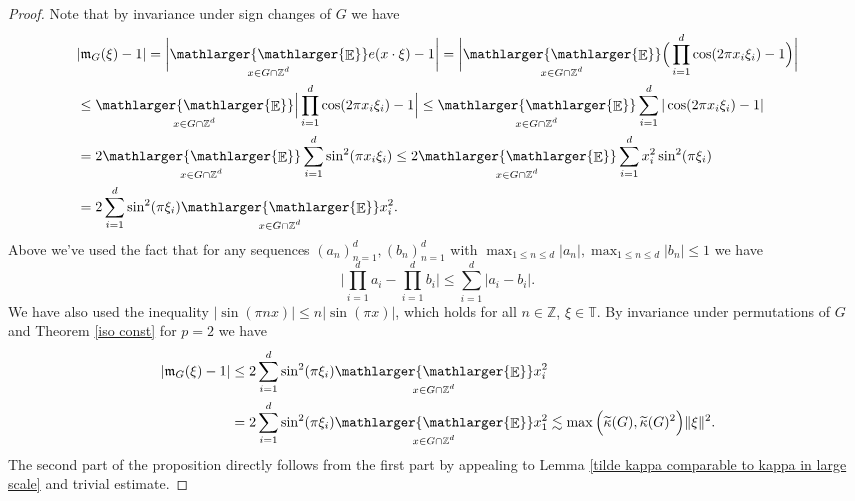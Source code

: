 \documentclass[a4paper,oneside, reqno]{amsart}
\numberwithin{equation}{section}
\theoremstyle{definition}%
\theoremstyle{definition}
\theoremstyle{definition}%
\theoremstyle{definition}
\newcommand{\E}{\mathop{\mathbb{E}}}
\newcommand{\Z}{\mathbb{Z}}
\newcommand{\T}{\mathbb{T}}
\newcommand{\se}[1]{\underset{_{\substack{#1}}}{\mathlarger{\mathlarger{\E}}}}
\begin{document}
\begin{proof}
    Note that by invariance under sign changes of $G$ we have
    \begin{align*}
      &|\mathfrak{m}_G(\xi)-1|= \bigg| \se{x \in G \cap \Z^d} e(x \cdot \xi) -1 \bigg|= \bigg| \se{x \in G \cap \Z^d} \Big( \prod_{i=1}^d \cos(2 \pi x_i \xi_i) -1  \Big)\bigg| \\
      &\le \se{x \in G \cap \Z^d}\Big| \prod_{i=1}^d \cos(2 \pi x_i \xi_i) -1  \Big| \le  \se{x \in G \cap \Z^d} \sum_{i=1}^d | \cos(2 \pi x_i \xi_i) -1|  \\
      &=2 \se{x \in G \cap \Z^d} \sum_{i=1}^d \sin^2(\pi x_i \xi_i) \le 2\se{x \in G \cap \Z^d} \sum_{i=1}^d x_i^2\sin^2(\pi \xi_i) \\
      &=2\sum_{i=1}^d \sin^2(\pi \xi_i)\se{x \in G \cap \Z^d} x_i^2.
    \end{align*}
    Above we've used the fact that for any sequences $(a_n)_{n=1}^d, (b_n)_{n=1}^d$ with $\max_{1\le n \le d} |a_n|, \max_{1\le n \le d} |b_n| \le 1$ we have
    \[
    \Big|\prod_{i=1}^d a_i- \prod_{i=1}^d b_i \Big| \le \sum_{i=1}^d |a_i-b_i|.
    \]
    We have also used the inequality $|\sin(\pi n x)| \le n |\sin(\pi x)| $, which holds for all $n \in \Z$, $\xi \in \T$. By invariance under permutations of $G$ and Theorem \ref{iso const} for $p=2$ we have 
    \begin{align*}
        |\mathfrak{m}_G(\xi)-1| &\le2\sum_{i=1}^d \sin^2(\pi \xi_i)\se{x \in G \cap \Z^d} x_i^2\\
        &= 2\sum_{i=1}^d \sin^2(\pi \xi_i)\se{x \in G \cap \Z^d} x_1^2 \lesssim \max\Big( \widetilde{\kappa}(G), \widetilde{\kappa}(G)^2 \Big)  \|\xi \|^2.
    \end{align*}
    The second part of the proposition directly follows from the first part by appealing to Lemma \ref{tilde kappa comparable to kappa in large scale} and trivial estimate.
\end{proof}
\end{document}
